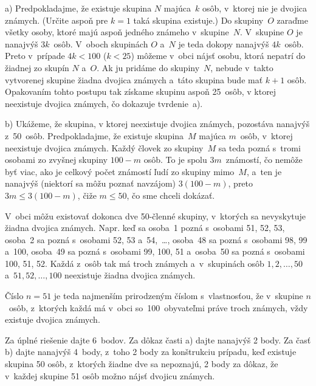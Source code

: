 {%
a) Predpokladajme, že existuje skupina $N$ majúca~$k$ osôb, v~ktorej nie je
dvojica známych. (Určite aspoň pre $k=1$ taká skupina existuje.) Do
skupiny~$O$ zaraďme všetky osoby, ktoré majú aspoň jedného známeho v~skupine~$N$. V~skupine $O$ je nanajvýš $3k$~osôb.
V~oboch skupinách $O$ a~$N$ je teda dokopy nanajvýš $4k$~osôb. Preto v~prípade
$4k<100$ ($k<25$) môžeme v~obci nájsť osobu, ktorá nepatrí do
žiadnej zo skupín $N$ a~$O$. Ak ju pridáme do skupiny~$N$, nebude v~takto
vytvorenej skupine žiadna dvojica známych a~táto skupina bude mať $k+1$ osôb.
Opakovaním tohto postupu tak získame skupinu aspoň 25~osôb, v ktorej
neexistuje dvojica známych, čo dokazuje tvrdenie~a).

b) Ukážeme, že skupina, v ktorej neexistuje dvojica známych, pozostáva
nanajvýš z~50~osôb.
Predpokladajme, že existuje skupina~$M$ majúca $m$~osôb, v~ktorej
neexistuje dvojica známych. Každý človek zo skupiny~$M$ sa teda pozná s~tromi
osobami zo zvyšnej skupiny $100-m$ osôb. To je spolu $3m$~známostí, čo nemôže
byť viac, ako je celkový počet známostí ľudí zo skupiny
mimo~$M$, a~ten je nanajvýš (niektorí sa môžu poznať navzájom) $3(100-m)$,
preto $3m\le3(100-m)$, čiže $m\le 50$, čo sme chceli dokázať.

V~obci môžu existovať dokonca dve 50-členné skupiny,
v~ktorých sa nevyskytuje žiadna dvojica známych. Napr. keď sa osoba~1 pozná
s~osobami 51, 52, 53, osoba~2 sa pozná s~osobami 52, 53 a~54,~\dots, osoba~48
sa pozná s~osobami 98, 99 a~100, osoba~49 sa pozná s~osobami 99, 100, 51 a~osoba~50
sa pozná s~osobami 100, 51, 52. Každá z~osôb tak má troch známych a~v~skupinách
osôb $1,2,\dots,50$ a~$51,52,\dots,100$ neexistuje žiadna dvojica známych.

Číslo $n=51$ je teda najmenším prirodzeným číslom s~vlastnosťou, že v~skupine
$n$~osôb, z~ktorých každá má v~obci so~100~obyvateľmi práve troch známych, vždy
existuje dvojica známych.

\nobreak\medskip\petit\noindent
Za úplné riešenie dajte 6~bodov. Za dôkaz časti a) dajte nanajvýš 2
body. Za časť b) dajte nanajvýš 4~body, z~toho 2 body za konštrukciu prípadu,
keď existuje skupina 50 osôb, z~ktorých žiadne dve sa nepoznajú, 2 body za dôkaz,
že v~každej skupine 51 osôb možno nájsť dvojicu známych.
\endpetit}

